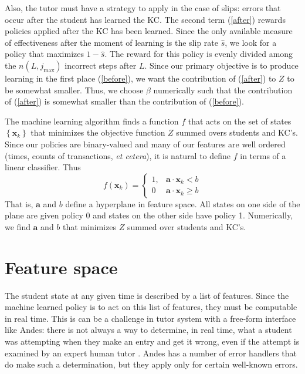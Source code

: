 \documentclass[11pt,letterpaper]{article}
\begin{document}
Also, the tutor must have a strategy to apply in the case of slips: 
errors that occur after the student has learned the KC.
The second term (\ref{after}) rewards policies applied after
the KC has been learned.  Since the only available measure of 
effectiveness after the moment of learning is the slip rate $\hat{s}$, 
we look for a policy that maximizes $1-\hat{s}$.  The reward for 
this policy is evenly divided among the $n(L,j_\mathrm{max})$ 
incorrect steps after $L$.
Since our primary objective is to produce learning in the first
place (\ref{before}), we want the contribution of (\ref{after})
to $Z$ to be somewhat smaller.  Thus, we choose $\beta$ numerically 
such that the contribution of (\ref{after}) is somewhat smaller than 
the contribution of (\ref{before}).

The machine learning algorithm finds a function $f$ that acts on
the set of states $\left\{\mathbf{x}_k\right\}$ that minimizes
the objective function $Z$ summed overs students and KC's.  
Since our policies are binary-valued
and many of our features are well ordered (times, counts of transactions,
{\em et cetera}), it is natural to define $f$ in terms of a 
linear classifier.  Thus
%
\begin{equation}
              f(\mathbf{x}_k) = \left\{\begin{array}{cc}
		1,& \mathbf{a}\cdot \mathbf{x}_k <b \\
                0 & \mathbf{a}\cdot \mathbf{x}_k \ge b
		\end{array} \right.
\end{equation}
%
That is, $\mathbf{a}$ and $b$ define a hyperplane in feature
space.  All states on one side of the plane are given policy 0
and states on the other side have policy 1.
Numerically, we find $\mathbf{a}$ and $b$ that minimizes $Z$
summed over students and KC's.

\section{Feature space}

The student state at any given time is described by a list of
features.   Since the machine learned policy is to act on this list of
features, they must be computable in real time.  This is can be a
challenge in tutor system with a free-form interface like  Andes:
there is not always a way to determine, in real time, what a student was
attempting when they make an entry and get it wrong, even if the attempt
is examined by an expert human tutor .  Andes has a
number of error handlers that do make such a determination, but they 
apply only for certain well-known errors.
\end{document}
